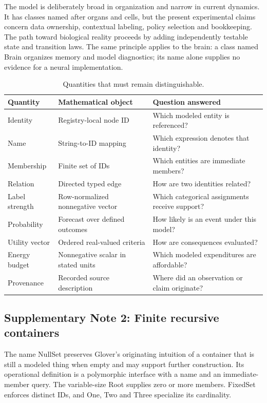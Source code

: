 \documentclass[10pt,a4paper]{article}
\begin{document}
The model is deliberately broad in organization and narrow in current dynamics. It has classes named after organs and cells, but the present experimental claims concern data ownership, contextual labeling, policy selection and bookkeeping. The path toward biological reality proceeds by adding independently testable state and transition laws. The same principle applies to the brain: a class named Brain organizes memory and model diagnostics; its name alone supplies no evidence for a neural implementation.

\begin{table}[htbp]\centering\small
\caption{Quantities that must remain distinguishable.}\label{tab:quantities}
\begin{tabular}{p{.2\linewidth}p{.3\linewidth}p{.41\linewidth}}\toprule
Quantity & Mathematical object & Question answered \\\midrule
Identity & Registry-local node ID & Which modeled entity is referenced? \\
Name & String-to-ID mapping & Which expression denotes that identity? \\
Membership & Finite set of IDs & Which entities are immediate members? \\
Relation & Directed typed edge & How are two identities related? \\
Label strength & Row-normalized nonnegative vector & Which categorical assignments receive support? \\
Probability & Forecast over defined outcomes & How likely is an event under this model? \\
Utility vector & Ordered real-valued criteria & How are consequences evaluated? \\
Energy budget & Nonnegative scalar in stated units & Which modeled expenditures are affordable? \\
Provenance & Recorded source description & Where did an observation or claim originate? \\\bottomrule
\end{tabular}\end{table}

\subsection*{Supplementary Note 2: Finite recursive containers}
The name NullSet preserves Glover's originating intuition of a container that is still a modeled thing when empty and may support further construction. Its operational definition is a polymorphic interface with a name and an immediate-member query. The variable-size Root supplies zero or more members. FixedSet enforces distinct IDs, and One, Two and Three specialize its cardinality.
\end{document}
